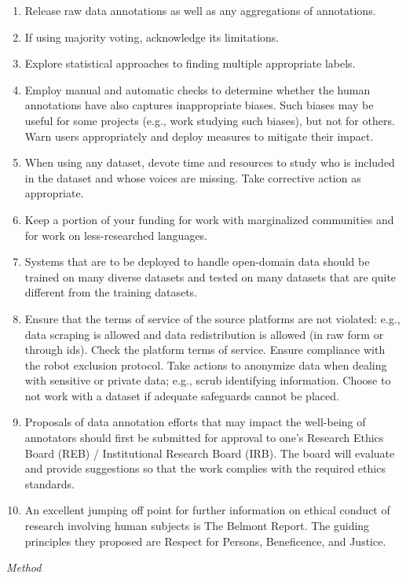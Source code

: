 \documentclass{clv3}
\begin{document}
{\begin{enumerate}
\item Release raw data annotations as well as any aggregations of annotations.
\item If using majority voting, acknowledge its limitations. %
\item Explore statistical approaches to finding multiple appropriate labels. %
\item Employ manual and automatic checks to determine whether the human annotations have also captures inappropriate biases. 
Such biases may be useful for some projects (e.g., work studying such biases), but not for others. Warn users appropriately and deploy measures to mitigate their impact.
\item When using any dataset, devote time and resources to study who is included in the dataset and whose voices are missing. Take corrective action as appropriate.
\item Keep a portion of your funding for work with marginalized communities and for work on less-researched languages.
\item Systems that are to be deployed to handle open-domain data should be trained on many diverse datasets and tested on many datasets that are quite different from the training datasets.
\item Ensure that the terms of service of the source platforms are not violated: e.g., data scraping is allowed and data redistribution is allowed (in raw form or through ids). Check the platform terms of service. Ensure compliance with the robot exclusion protocol.
Take actions to anonymize data when dealing with sensitive or private data; e.g., scrub identifying information. Choose to not work with a dataset if adequate safeguards cannot be placed.
\item Proposals of data annotation efforts that may impact the well-being of annotators should first be submitted for approval to one’s Research Ethics Board (REB) / Institutional Research Board (IRB). The board will evaluate and provide suggestions so that the work complies with the required ethics standards.
\item An excellent jumping off point for further information on ethical conduct of research involving human subjects is The Belmont Report. The guiding principles they proposed are Respect for Persons, Beneficence, and Justice.
\end{enumerate}
\noindent \textit{Method}
\begin{enumerate}

\end{enumerate}}
\end{document}
